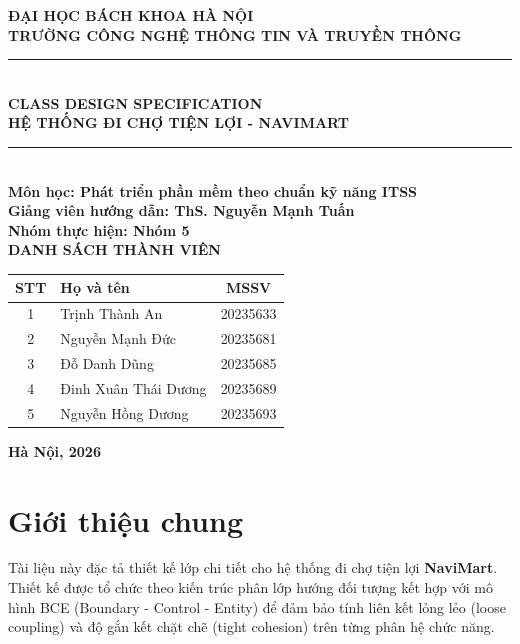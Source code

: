 \documentclass[12pt,a4paper]{article}
\begin{document}
\begin{titlepage}
    \begin{center}
        \textbf{\Large ĐẠI HỌC BÁCH KHOA HÀ NỘI} \\
        \textbf{\Large TRƯỜNG CÔNG NGHỆ THÔNG TIN VÀ TRUYỀN THÔNG} \\
        \vskip 3cm
        \noindent\rule{\textwidth}{2pt} \\
        \vskip 0.6cm
        \textbf{\Huge CLASS DESIGN SPECIFICATION} \\[0.5em]
        \textbf{\huge HỆ THỐNG ĐI CHỢ TIỆN LỢI - NAVIMART} \\
        \noindent\rule{\textwidth}{2pt} \\
        \vskip 1.5cm
        \textbf{\large Môn học: Phát triển phần mềm theo chuẩn kỹ năng ITSS} \\
        \textbf{\large Giảng viên hướng dẫn: ThS. Nguyễn Mạnh Tuấn} \\
        \textbf{\large Nhóm thực hiện: Nhóm 5} \\
        \vskip 1.5cm
        \textbf{\large DANH SÁCH THÀNH VIÊN} \\
        \vskip 0.4cm
        \begin{tabular}{|c|l|c|}
            \hline
            \textbf{STT} & \textbf{Họ và tên} & \textbf{MSSV} \\
            \hline
            1 & Trịnh Thành An & 20235633 \\
            \hline
            2 & Nguyễn Mạnh Đức & 20235681 \\
            \hline
            3 & Đỗ Danh Dũng & 20235685 \\
            \hline
            4 & Đinh Xuân Thái Dương & 20235689 \\
            \hline
            5 & Nguyễn Hồng Dương & 20235693 \\
            \hline
        \end{tabular}
        \vfill
        \textbf{Hà Nội, 2026}
    \end{center}
\end{titlepage}

\tableofcontents
\newpage

\section{Giới thiệu chung}

Tài liệu này đặc tả thiết kế lớp chi tiết cho hệ thống đi chợ tiện lợi \textbf{NaviMart}. Thiết kế được tổ chức theo kiến trúc phân lớp hướng đối tượng kết hợp với mô hình BCE (Boundary - Control - Entity) để đảm bảo tính liên kết lỏng lẻo (loose coupling) và độ gắn kết chặt chẽ (tight cohesion) trên từng phân hệ chức năng.
\end{document}
